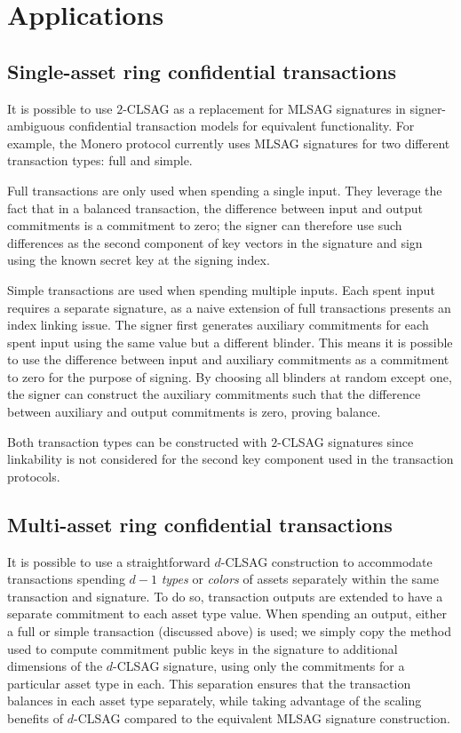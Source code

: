 \documentclass[draft]{llncs} %
\begin{document}
\section{Applications}\label{sec:applications}

\subsection{Single-asset ring confidential transactions}\label{sec:ringct}
It is possible to use $2$-CLSAG as a replacement for MLSAG signatures in signer-ambiguous confidential transaction models for equivalent functionality. For example, the Monero protocol currently uses MLSAG signatures for two different transaction types: full and simple.

Full transactions are only used when spending a single input. They leverage the fact that in a balanced transaction, the difference between input and output commitments is a commitment to zero; the signer can therefore use such differences as the second component of key vectors in the signature and sign using the known secret key at the signing index.

Simple transactions are used when spending multiple inputs. Each spent input requires a separate signature, as a naive extension of full transactions presents an index linking issue. The signer first generates auxiliary commitments for each spent input using the same value but a different blinder. This means it is possible to use the difference between input and auxiliary commitments as a commitment to zero for the purpose of signing. By choosing all blinders at random except one, the signer can construct the auxiliary commitments such that the difference between auxiliary and output commitments is zero, proving balance.

Both transaction types can be constructed with $2$-CLSAG signatures since linkability is not considered for the second key component used in the transaction protocols.


\subsection{Multi-asset ring confidential transactions}\label{sec:marct}

It is possible to use a straightforward $d$-CLSAG construction to accommodate transactions spending $d-1$ \textit{types} or \textit{colors} of assets separately within the same transaction and signature. To do so, transaction outputs are extended to have a separate commitment to each asset type value. When spending an output, either a full or simple transaction (discussed above) is used; we simply copy the method used to compute commitment public keys in the signature to additional dimensions of the $d$-CLSAG signature, using only the commitments for a particular asset type in each. This separation ensures that the transaction balances in each asset type separately, while taking advantage of the scaling benefits of $d$-CLSAG compared to the equivalent MLSAG signature construction.
\end{document}
